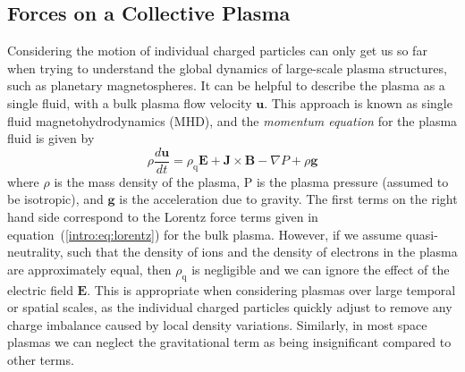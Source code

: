 \subsection{Forces on a Collective Plasma}\label{intro:sec:plasmaforces}
Considering the motion of individual charged particles can only get us so far when trying to understand the global dynamics of large-scale plasma structures, such as planetary magnetospheres. It can be helpful to describe the plasma as a single fluid, with a bulk plasma flow velocity $\boldsymbol{u}$. This approach is known as single fluid magnetohydrodynamics (MHD), and the \textit{momentum equation} for the plasma fluid is given by
\begin{equation}\label{intro:eq:momentum}
\rho\frac{d\boldsymbol{u}}{dt} = \rho_\mathrm{q}\boldsymbol{E} + \boldsymbol{J}\times\boldsymbol{B} - \nabla P + \rho \boldsymbol{g}
\end{equation}
where $\rho$ is the mass density of the plasma, P is the plasma pressure (assumed to be isotropic), and $\boldsymbol{g}$ is the acceleration due to gravity. The first terms on the right hand side correspond to the Lorentz force terms given in equation~(\ref{intro:eq:lorentz}) for the bulk plasma. However, if we assume quasi-neutrality, such that the density of ions and the density of electrons in the plasma are approximately equal, then $\rho_\mathrm{q}$ is negligible and we can ignore the effect of the electric field $\boldsymbol{E}$. This is appropriate when considering plasmas over large temporal or spatial scales, as the individual charged particles quickly adjust to remove any charge imbalance caused by local density variations. Similarly, in most space plasmas we can neglect the gravitational term as being insignificant compared to other terms.

